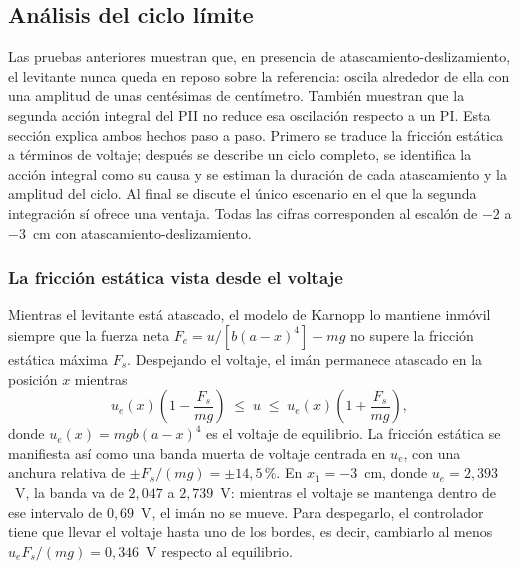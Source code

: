 \subsection{Análisis del ciclo límite}
\label{sec:analisis_ciclo}

Las pruebas anteriores muestran que, en presencia de atascamiento-deslizamiento, el levitante nunca queda en reposo sobre la referencia: oscila alrededor de ella con una amplitud de unas centésimas de centímetro. También muestran que la segunda acción integral del PII no reduce esa oscilación respecto a un PI. Esta sección explica ambos hechos paso a paso. Primero se traduce la fricción estática a términos de voltaje; después se describe un ciclo completo, se identifica la acción integral como su causa y se estiman la duración de cada atascamiento y la amplitud del ciclo. Al final se discute el único escenario en el que la segunda integración sí ofrece una ventaja. Todas las cifras corresponden al escalón de $-2$ a $-3$~cm con atascamiento-deslizamiento.

\subsubsection{La fricción estática vista desde el voltaje}

Mientras el levitante está atascado, el modelo de Karnopp lo mantiene inmóvil siempre que la fuerza neta $F_e = u/[b(a-x)^4] - mg$ no supere la fricción estática máxima $F_s$. Despejando el voltaje, el imán permanece atascado en la posición $x$ mientras
\begin{equation}
u_e(x)\left(1-\frac{F_s}{mg}\right) \;\le\; u \;\le\; u_e(x)\left(1+\frac{F_s}{mg}\right),
\label{eq:banda_voltaje}
\end{equation}
donde $u_e(x)=mgb(a-x)^4$ es el voltaje de equilibrio. La fricción estática se manifiesta así como una banda muerta de voltaje centrada en $u_e$, con una anchura relativa de $\pm F_s/(mg)=\pm14{,}5$\,\%. En $x_1=-3$~cm, donde $u_e=2{,}393$~V, la banda va de $2{,}047$ a $2{,}739$~V: mientras el voltaje se mantenga dentro de ese intervalo de $0{,}69$~V, el imán no se mueve. Para despegarlo, el controlador tiene que llevar el voltaje hasta uno de los bordes, es decir, cambiarlo al menos $u_e F_s/(mg)=0{,}346$~V respecto al equilibrio.

